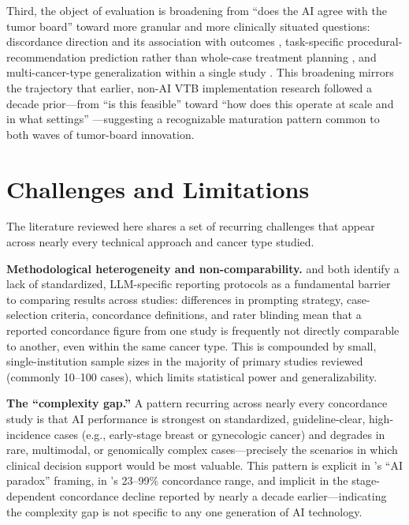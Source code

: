 \documentclass{article}
\begin{document}
Third, the object of evaluation is broadening from ``does the AI agree with the tumor board'' toward more granular and more clinically situated questions: discordance direction and its association with outcomes \cite{aliyev2026}, task-specific procedural-recommendation prediction rather than whole-case treatment planning \cite{aubreville2024}, and multi-cancer-type generalization within a single study \cite{liu2026,pinninti2026}. This broadening mirrors the trajectory that earlier, non-AI VTB implementation research followed a decade prior---from ``is this feasible'' \cite{marshall2014} toward ``how does this operate at scale and in what settings'' \cite{thiagarajan2023}---suggesting a recognizable maturation pattern common to both waves of tumor-board innovation.

\section{Challenges and Limitations}
\label{sec:challenges}

The literature reviewed here shares a set of recurring challenges that appear across nearly every technical approach and cancer type studied.

\textbf{Methodological heterogeneity and non-comparability.} \citet{carl2024} and \citet{wu2026} both identify a lack of standardized, LLM-specific reporting protocols as a fundamental barrier to comparing results across studies: differences in prompting strategy, case-selection criteria, concordance definitions, and rater blinding mean that a reported concordance figure from one study is frequently not directly comparable to another, even within the same cancer type. This is compounded by small, single-institution sample sizes in the majority of primary studies reviewed (commonly 10--100 cases), which limits statistical power and generalizability.

\textbf{The ``complexity gap.''} A pattern recurring across nearly every concordance study is that AI performance is strongest on standardized, guideline-clear, high-incidence cases (e.g., early-stage breast or gynecologic cancer) and degrades in rare, multimodal, or genomically complex cases---precisely the scenarios in which clinical decision support would be most valuable. This pattern is explicit in \citeauthor{seshachalam2026}'s \citeyearpar{seshachalam2026} ``AI paradox'' framing, in \citeauthor{wu2026}'s \citeyearpar{wu2026} 23--99\% concordance range, and implicit in the stage-dependent concordance decline reported by \citet{somashekhar2018} nearly a decade earlier---indicating the complexity gap is not specific to any one generation of AI technology.
\end{document}
